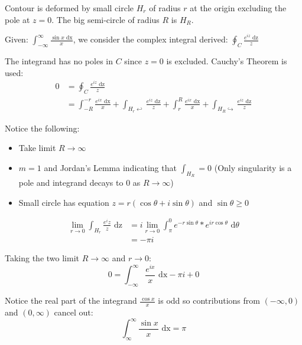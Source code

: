 \documentclass[10pt,a4paper]{article}
\begin{document}
Contour is deformed by small circle $H_r$ of radius $r$ at the origin excluding the pole at $z=0$. The big
semi-circle of radius $R$ is $H_R$.

Given: $\int_{-\infty}^{\infty}\frac{\sin x \text{ dx}}{x}$, we consider the complex integral
derived: $\oint_C \frac{e^{iz}\text{ dz}}{z}$ \par 

The integrand has no poles in $C$ since $z=0$ is excluded. Cauchy's Theorem is used:
\begin{equation*} 
    \begin{aligned}
        0 &= \oint_C \frac{e^{iz}\text{ dz}}{z} \\
        &= \int_{-R}^{-r} \frac{e^{ix}\text{ dx}}{x} + \int_{H_r \hookleftarrow} \frac{e^{iz} \text{ dz}}{z} + \int_r^R \frac{e^{ix}\text{ dx}}{x} + \int_{H_R \hookrightarrow} \frac{e^{iz}\text{ dz}}{z}
    \end{aligned}
\end{equation*}

Notice the following:
\begin{itemize}
    \item Take limit $R\rightarrow \infty$
    \item $m=1$ and Jordan's Lemma indicating that $\int_{H_R} = 0$ (Only singularity is a pole and
    integrand decays to 0 as $R\rightarrow \infty$)
    \item Small circle has equation $z=r(\cos \theta + i\sin \theta)$ and $\sin \theta \geq 0$
\end{itemize}
\begin{equation*} 
    \begin{aligned}
        \lim_{r\rightarrow 0}\int_{H_r} \frac{e^iz}{z} \text{ dz} &= i\lim_{r\rightarrow 0}\int_\pi^0 e^{-r\sin \theta}*e^{ir\cos \theta} \text{ d}\theta \\
        &= -\pi i
    \end{aligned}
\end{equation*}

Taking the two limit $R\rightarrow \infty$ and $r\rightarrow 0$:
$$
0 = \int_{-\infty}^\infty \frac{e^{ix}}{x} \text{ dx} - \pi i + 0
$$

Notice the real part of the integrand $\frac{\cos x}{x}$ is odd so contributions from $(-\infty,0)$
and $(0, \infty)$ cancel out: 
$$
\int_{\infty}^\infty \frac{\sin x}{x} \text{ dx} = \pi
$$


\end{document}

